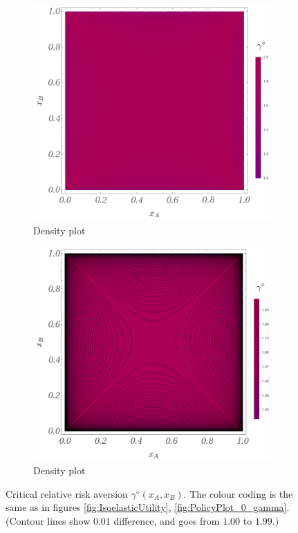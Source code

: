 \documentclass{article}
\theoremstyle{definition}
\begin{document}
\begin{figure}[H]
\begin{subfigure}[b]{0.45\textwidth}
        \includegraphics[width=\textwidth]{img/gamma_diamond_Density.png}
        \caption{Density plot}
        \label{fig:gamma_diamond_Density}
    \end{subfigure}
    \par
    \begin{subfigure}[b]{0.45\textwidth}
        \includegraphics[width=\textwidth]{img/gamma_diamond_Contour.png}
        \caption{Density plot}
        \label{fig:gamma_diamond_Contour}
    \end{subfigure}
    
    \caption{Critical relative risk aversion $\gamma^\diamond(x_A,x_B)$. 
    The colour coding is the same as in figures \ref{fig:IsoelasticUtility}, \ref{fig:PolicyPlot_0_gamma}.
    (Contour lines show $0.01$ difference, and goes from $1.00$ to $1.99$.)}
    \label{fig:gamma_diamond}
\end{figure}
\end{document}
